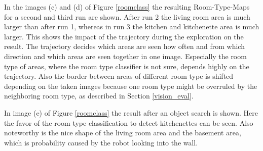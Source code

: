 In the images (c) and (d) of Figure \ref{roomclass} the resulting Room-Type-Maps for a second and third run are shown. After run 2 the living room area is much larger than after run 1, whereas in run 3 the kitchen and kitchenette area is much larger. This shows the impact of the trajectory during the exploration on the result. The trajectory decides which areas are seen how often and from which direction and which areas are seen together in one image. Especially the room type of areas, where the room type classifier is not sure, depends highly on the trajectory. Also the border between areas of different room type is shifted depending on the taken images because one room type might be overruled by the neighboring room type, as described in Section \ref{vision_eval}.

In image (e) of Figure \ref{roomclass} the result after an object search is shown. Here the favor of the room type classification to detect kitchenettes can be seen. Also noteworthy is the nice shape of the living room area and the basement area, which is probability caused by the robot looking into the wall.

